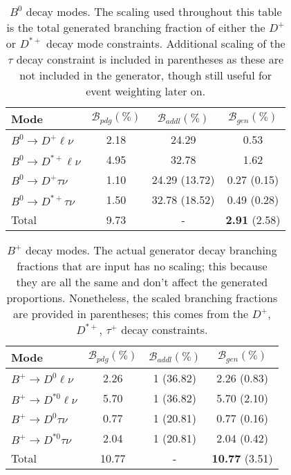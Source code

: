 \documentclass{article}
\renewcommand{\(}{\left(}
\renewcommand{\)}{\right)}
\numberwithin{equation}{section}
\begin{document}
\begin{table}[H]
  \begin{center}
    \begin{tabular}{ l c c c }
      Mode & $\mathcal{B}_{pdg}(\%)$ & $\mathcal{B}_{addl}(\%)$ & $\mathcal{B}_{gen}(\%)$ \\
      \hline\hline
      $B^0\rightarrow D^+\ell\nu$ & 2.18 & 24.29 & 0.53 \\
      \hline
      $B^0\rightarrow D^{*+}\ell\nu$ & 4.95 & 32.78 & 1.62 \\
      \hline
      $B^0\rightarrow D^{+}\tau\nu$ & 1.10 & 24.29 (13.72) & 0.27 (0.15) \\
      \hline
      $B^0\rightarrow D^{*+}\tau\nu$ & 1.50 & 32.78 (18.52) & 0.49 (0.28)\\
      \hline
      Total & 9.73 & - & \textbf{2.91} (2.58) \\
      \hline
    \end{tabular}
  \end{center}
  \caption{$B^{0}$ decay modes. The scaling used throughout this table is the total generated branching fraction of either the $D^+$ or $D^{*+}$ decay mode constraints. Additional scaling of the $\tau$ decay constraint is included in parentheses as these are not included in the generator, though still useful for event weighting later on. }
\end{table}

\begin{table}[H]
  \begin{center}
    \begin{tabular}{ l c c c }
      Mode & $\mathcal{B}_{pdg}(\%)$ & $\mathcal{B}_{addl}(\%)$ & $\mathcal{B}_{gen}(\%)$ \\
      \hline\hline
      $B^+\rightarrow D^0\ell\nu$ & 2.26 & 1 (36.82) & 2.26 (0.83) \\
      \hline
      $B^+\rightarrow D^{*0}\ell\nu$ & 5.70 & 1 (36.82) & 5.70 (2.10) \\
      \hline
      $B^+\rightarrow D^{0}\tau\nu$ & 0.77 & 1 (20.81) & 0.77 (0.16) \\
      \hline
      $B^+\rightarrow D^{*0}\tau\nu$ & 2.04 & 1 (20.81) & 2.04 (0.42) \\
      \hline
      Total & 10.77 & - & \textbf{10.77} (3.51) \\
      \hline
    \end{tabular}
  \end{center}
  \caption{$B^{+}$ decay modes. The actual generator decay branching fractions that are input has no scaling; this because they are all the same and don't affect the generated proportions. Nonetheless, the scaled branching fractions are provided in parentheses; this comes from the $D^+$, $D^{*+}$, $\tau^+$ decay constraints.}
\end{table}
\end{document}
